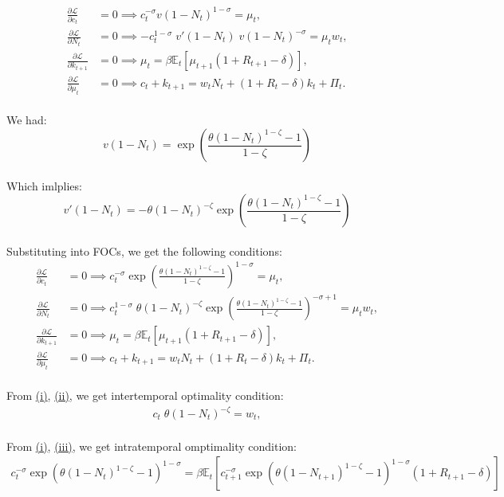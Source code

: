 \documentclass[12pt]{extarticle}
\begin{document}
\begin{align}
    \frac{\partial \mathcal{L}}{\partial c_t} &= 0 \implies c_t^{-\sigma} v(1-N_t)^{1-\sigma} = \mu_t,\\
    \frac{\partial \mathcal{L}}{\partial N_t} &= 0 \implies -c_t^{1-\sigma}\;v'(1-N_t)\;v(1-N_t)^{-\sigma} = \mu_t w_t, \\
    \frac{\partial \mathcal{L}}{\partial k_{t+1}} &= 0 \implies \mu_t = \beta \mathbb{E}_t \left[ \mu_{t+1} (1+R_{t+1}-\delta) \right],\\
    \frac{\partial \mathcal{L}}{\partial \mu_t} &= 0 \implies c_t + k_{t+1} = w_t N_t + (1+R_t-\delta) k_t + \Pi_t .
\end{align}\\
We had: 
$$v(1-N_t) = \exp\left(\frac{\theta(1-N_t)^{1-\zeta}-1}{1-\zeta}\right)$$\\
Which imlplies:
$$v'(1-N_t) = -\theta (1-N_t)^{-\zeta}\exp\left(\frac{\theta(1-N_t)^{1-\zeta}-1}{1-\zeta}\right)$$\\
\newpage
Substituting into FOCs, we get the following conditions:
\setcounter{equation}{0}
\renewcommand{\theequation}{\roman{equation}}
\begin{align}
    \frac{\partial \mathcal{L}}{\partial c_t} &= 0 \implies c_t^{-\sigma}\exp\left(\frac{\theta(1-N_t)^{1-\zeta}-1}{1-\zeta}\right)^{1-\sigma} = \mu_t, \label{equation:eq1}\\
    \frac{\partial \mathcal{L}}{\partial N_t} &= 0 \implies c_t^{1-\sigma}\;\theta (1-N_t)^{-\zeta}\exp\left(\frac{\theta(1-N_t)^{1-\zeta}-1}{1-\zeta}\right)^{-\sigma+1} = \mu_t w_t, \label{equation:eq2}\\
    \frac{\partial \mathcal{L}}{\partial k_{t+1}} &= 0 \implies \mu_t = \beta \mathbb{E}_t \left[ \mu_{t+1} (1+R_{t+1}-\delta) \right], \label{equation:eq3}\\
    \frac{\partial \mathcal{L}}{\partial \mu_t} &= 0 \implies c_t + k_{t+1} = w_t N_t + (1+R_t-\delta) k_t + \Pi_t \label{equation:eq4}.
\end{align}\\
From \href{equation:eq1}{(i)}, \href{equation:eq2}{(ii)}, we get intertemporal optimality condition:\\
\begin{align}
    c_t\;\theta (1-N_t)^{-\zeta} =  w_t, \label{equation:eq5}
\end{align}\\
From \href{equation:eq1}{(i)}, \href{equation:eq3}{(iii)}, we get intratemporal omptimality condition:\\
\begin{align}
    c_t^{-\sigma}{\exp\left({\theta(1-N_t)^{1-\zeta}-1}\right)^{1-\sigma}} = \beta \mathbb{E}_t \left[  c_{t+1}^{-\sigma}{\exp\left({\theta(1-N_{t+1})^{1-\zeta}-1}\right)^{1-\sigma}} (1+R_{t+1}-\delta) \right]
\end{align}
\end{document}
